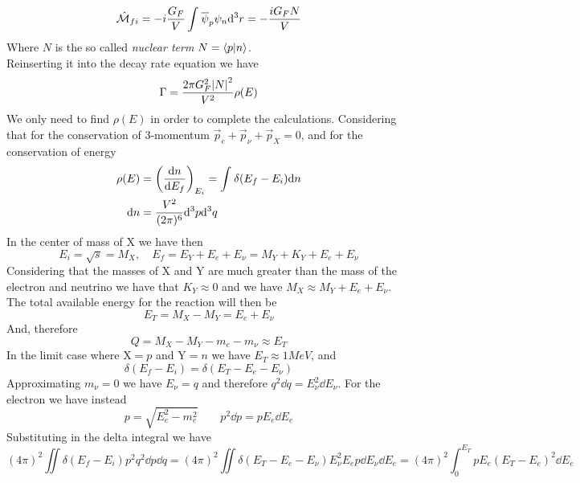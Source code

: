 \documentclass[../qm.tex]{subfiles}
\begin{document}
\begin{equation}
	\hat{\mathcal{M}}_{fi}=-i\frac{G_F}{V}\int_{}^{}\overline{\psi}_p\psi_n\dd^3r=-\frac{iG_FN}{V}
	\label{eq:transmatrixfermidec}
\end{equation}
Where $N$ is the so called \emph{nuclear term} $N=\bra{p}\ket{n}$.\\
Reinserting it into the decay rate equation we have
\begin{equation*}
	\Gamma=\frac{2\pi G_F^2\abs{N}^2}{V^2}\rho(E)
\end{equation*}
We only need to find $\rho(E)$ in order to complete the calculations. Considering that for the conservation of 3-momentum $\vec{p}_e+\vec{p}_\nu+\vec{p}_X=0$, and for the conservation of energy
\begin{equation}
	\begin{aligned}
		\rho(E)&=\left(\dv{n}{E_f}\right)_{E_i}=\int_{}^{}\delta(E_f-E_i)\dd n\\
		\dd n&=\frac{V^2}{(2\pi)^6}\dd^3p\dd^3q
	\end{aligned}
	\label{eq:densitycalc}
\end{equation}
In the center of mass of X we have then
\begin{equation*}
	E_i=\sqrt{s}=M_X,\quad E_f=E_Y+E_e+E_\nu=M_Y+K_Y+E_e+E_\nu
\end{equation*}
Considering that the masses of X and Y are much greater than the mass of the electron and neutrino we have that $K_Y\approx0$ and we have $M_X\approx M_Y+E_e+E_\nu$. The total available energy for the reaction will then be
\begin{equation*}
	E_T=M_X-M_Y=E_e+E_\nu
\end{equation*}
And, therefore
\begin{equation*}
	Q=M_X-M_Y-m_e-m_\nu\approx E_T
\end{equation*}
In the limit case where $\mathrm{X}=p$ and $\mathrm{Y}=n$ we have $E_T\approx1\unit{MeV}$, and
\begin{equation*}
	\delta(E_f-E_i)=\delta(E_T-E_e-E_\nu)
\end{equation*}
Approximating $m_\nu=0$ we have $E_\nu=q$ and therefore $q^2\dd q=E_\nu^2\dd E_\nu$. For the electron we have instead
\begin{equation*}
	p=\sqrt{E_e^2-m_e^2}\qquad p^2\dd p=pE_e\dd E_e
\end{equation*}
Substituting in the delta integral we have
\begin{equation*}
	(4\pi)^2\iint\delta(E_f-E_i)p^2q^2\dd p\dd q=(4\pi)^2\iint\delta(E_T-E_e-E_\nu)E_\nu^2E_ep\dd E_\nu\dd E_e=(4\pi)^2\int_{0}^{E_T}pE_e(E_T-E_e)^2\dd E_e
\end{equation*}
\end{document}
